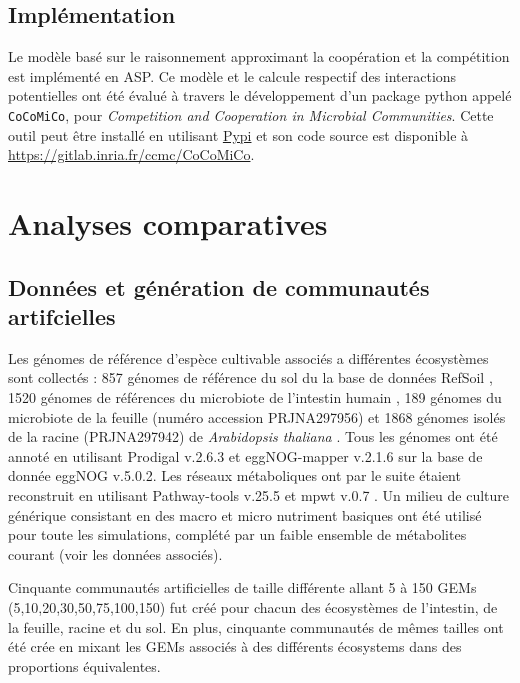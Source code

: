 \subsection{Implémentation} Le modèle basé sur le raisonnement approximant la coopération et la compétition  est implémenté en ASP. Ce modèle et le calcule respectif des interactions potentielles ont été évalué à travers le développement d'un package python appelé \texttt{CoCoMiCo}, pour \textit{Competition and Cooperation in Microbial Communities}. Cette outil peut être installé en utilisant \href{https://pypi.org/project/CoCoMiCo/}{Pypi}
et son code source est disponible à  \url{https://gitlab.inria.fr/ccmc/CoCoMiCo}.

\section{Analyses comparatives}

\subsection{Données et génération de communautés artifcielles} Les génomes de référence d'espèce cultivable associés a différentes écosystèmes sont collectés : 857 génomes de référence du sol du la base de données RefSoil \citep{Choi2017}, 1520 génomes de références du microbiote de l'intestin humain \citep{Zou2019}, 189 génomes du microbiote de la feuille (numéro accession PRJNA297956) et 1868 génomes isolés de la racine (PRJNA297942) de \textit{Arabidopsis thaliana} \citep{Bai2015}. Tous les génomes ont été annoté en utilisant Prodigal \citep{Hyatt2010} v.2.6.3 et eggNOG-mapper \citep{Cantalapiedra2021} v.2.1.6 sur la base de donnée eggNOG \citep{Huerta-Cepas2019} v.5.0.2. Les réseaux métaboliques ont par le suite étaient reconstruit en utilisant Pathway-tools v.25.5 \citep{Karp2022} et mpwt v.0.7 \citep{Belcour.2020}. Un milieu de culture générique consistant en des macro et micro nutriment basiques ont été utilisé pour toute les simulations, complété par un faible ensemble de métabolites courant (voir les données associés). 

Cinquante communautés artificielles de taille différente allant 5 à 150 GEMs (5,10,20,30,50,75,100,150) fut créé pour chacun des écosystèmes de l'intestin, de la feuille, racine et du sol. En plus, cinquante communautés de mêmes tailles  ont été crée en mixant les GEMs associés à des différents écosystems dans des proportions équivalentes.

